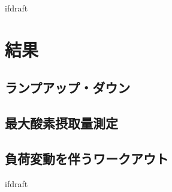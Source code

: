 \expandafter\ifx\csname ifdraft\endcsname\relax
 
\fi

\section{結果}

\subsection{ランプアップ・ダウン}

\subsection{最大酸素摂取量測定}

\subsection{負荷変動を伴うワークアウト}

\expandafter\ifx\csname ifdraft\endcsname\relax
  
\fi

